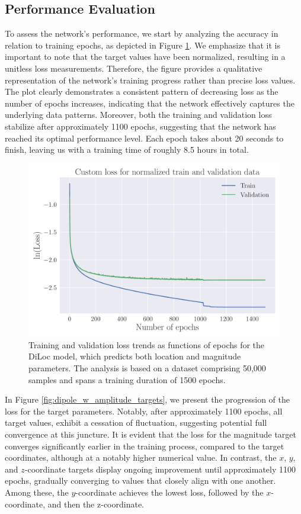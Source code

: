 \documentclass[a4paper, UKenglish, 11pt]{uiomaster}
\begin{document}
\subsection{Performance Evaluation}
To assess the network's performance, we start by analyzing the accuracy in relation to training epochs, as depicted in Figure \ref{fig:dipole_w_amplitude_loss}. We emphasize that it is important to note that the target values have been normalized, resulting in a unitless loss measurements. Therefore, the figure provides a qualitative representation of the network's training progress rather than precise loss values. The plot clearly demonstrates a consistent pattern of decreasing loss as the number of epochs increases, indicating that the network effectively captures the underlying data patterns. Moreover, both the training and validation loss stabilize after approximately 1100 epochs, suggesting that the network has reached its optimal performance level. Each epoch takes about 20 seconds to finish, leaving us with a training time of roughly 8.5 hours in total.

\begin{figure}[!htb]
    \centering
    \includegraphics[width=\linewidth]{figures/NN_magnitude/Custom_Loss_amplitudes_test_custom_loss_tanh_32_0.001_0.35_0.1_0_1500_(0).pdf}
    \caption{Training and validation loss trends as functions of epochs for the DiLoc model, which predicts both location and magnitude parameters. The analysis is based on a dataset comprising 50,000 samples and spans a training duration of 1500 epochs.}
    \label{fig:dipole_w_amplitude_loss}
\end{figure}


In Figure \ref{fig:dipole_w_amplitude_targets}, we present the progression of the loss for the target parameters. Notably, after approximately 1100 epochs, all target values, exhibit a cessation of fluctuation, suggesting potential full convergence at this juncture. It is evident that the loss for the magnitude target converges significantly earlier in the training process, compared to the target coordinates, although at a notably higher numerical value. In contrast, the $x$, $y$, and $z$-coordinate targets display ongoing improvement until approximately 1100 epochs, gradually converging to values that closely align with one another. Among these, the $y$-coordinate achieves the lowest loss, followed by the $x$-coordinate, and then the z-coordinate.
\end{document}
